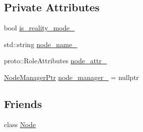 \subsection*{Private Attributes}
\begin{DoxyCompactItemize}
\item 
bool \hyperlink{classapollo_1_1cyber_1_1NodeChannelImpl_a2727f3bf4d17159d40a227907e724f77}{is\-\_\-reality\-\_\-mode\-\_\-}
\item 
std\-::string \hyperlink{classapollo_1_1cyber_1_1NodeChannelImpl_a51ce4992fd91e72b19136aec54e4daad}{node\-\_\-name\-\_\-}
\item 
proto\-::\-Role\-Attributes \hyperlink{classapollo_1_1cyber_1_1NodeChannelImpl_ab33e7d859d8d8dfcaebcb792ed0d35d8}{node\-\_\-attr\-\_\-}
\item 
\hyperlink{classapollo_1_1cyber_1_1NodeChannelImpl_a76419b008ecf39b123338689c251b253}{Node\-Manager\-Ptr} \hyperlink{classapollo_1_1cyber_1_1NodeChannelImpl_a7ec5af6525870f87b9f0cc7b2863bd2a}{node\-\_\-manager\-\_\-} = nullptr
\end{DoxyCompactItemize}
\subsection*{Friends}
\begin{DoxyCompactItemize}
\item 
class \hyperlink{classapollo_1_1cyber_1_1NodeChannelImpl_a6db9d28bd448a131448276ee03de1e6d}{Node}
\end{DoxyCompactItemize}


